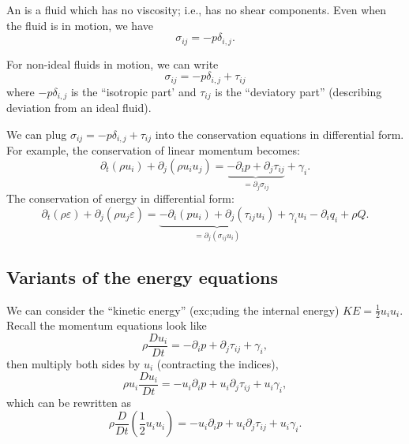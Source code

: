 \begin{definition}
An  is a fluid which has no viscosity; i.e., has
no shear components. Even when the fluid is in motion, we have
\begin{equation*}
\sigma_{ij}=-p\delta_{i,j}.
\end{equation*}
\end{definition}

\begin{node}
For non-ideal fluids in motion, we can write
\begin{equation}
\sigma_{ij}=-p\delta_{i,j}+\tau_{ij}
\end{equation}
where $-p\delta_{i,j}$ is the ``isotropic part' and $\tau_{ij}$ is the
``deviatory part'' (describing deviation from an ideal fluid).
\end{node}

\begin{node}
We can plug $\sigma_{ij}=-p\delta_{i,j}+\tau_{ij}$ into the
conservation equations in differential form. For example, the
conservation of linear momentum becomes:
\begin{equation}
\partial_{t}(\rho u_{i}) + \partial_{j}(\rho u_{i}u_{j})
=\underbrace{-\partial_{i}p+\partial_{j}\tau_{ij}}_{=\partial_{j}\sigma_{ij}}+\gamma_{i}.
\end{equation}
The conservation of energy in differential form:
\begin{equation}\label{eq:fluids:fall-lec7:eq-2}
\partial_{t}(\rho\varepsilon)+\partial_{j}(\rho u_{j}\varepsilon)
=\underbrace{-\partial_{i}(pu_{i})+\partial_{j}(\tau_{ij}u_{i})}_{=\partial_{j}(\sigma_{ij}u_{i})}
+\gamma_{i}u_{i}-\partial_{i}q_{i}+\rho Q.
\end{equation}
\end{node}

\subsection{Variants of the energy equations}

\begin{node}
We can consider the ``kinetic energy'' (exc;uding the internal energy)
$KE=\frac{1}{2}u_{i}u_{i}$. Recall the momentum equations look like
\begin{equation}
\rho\frac{D u_{i}}{D t}=-\partial_{i}p+\partial_{j}\tau_{ij}+\gamma_{i},
\end{equation}
then multiply both sides by $u_{i}$ (contracting the indices),
\begin{equation}
\rho u_{i}\frac{D u_{i}}{D t}=-u_{i}\partial_{i}p+u_{i}\partial_{j}\tau_{ij}+u_{i}\gamma_{i},
\end{equation}
which can be rewritten as
\begin{equation}\label{eq:fluids:fall-lec7:eq-3}
\rho\frac{D}{Dt}\left(\frac{1}{2}u_{i}u_{i}\right)
=-u_{i}\partial_{i}p+u_{i}\partial_{j}\tau_{ij}+u_{i}\gamma_{i}.
\end{equation}
\end{node}

